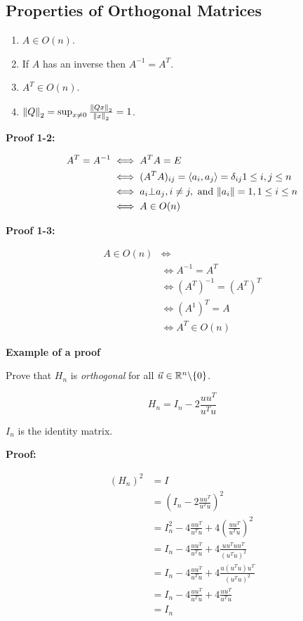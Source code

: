 \subsection{Properties of Orthogonal Matrices}

\begin{enumerate}
   
    \item \(A \in O(n)\).
   
    \item If \(A\) has an inverse then \(A^{-1} = A^T\).
   
    \item \(A^T \in O(n)\).

    \item \(\left\| Q \right\|_2 = \sup_{x \ne 0} \frac{\left\| Qx \right\|_2}{\left\| x \right\|_2} = 1\).

\end{enumerate}

\textbf{Proof 1-2:}

\begin{align*}
    A^T = A^{-1} &\iff A^T A = E\\
                 &\iff (A^T A)_{ij} = \left\langle a_i, a_j\right\rangle = \delta_{ij} 1 \le i,j \le n\\
                 &\iff a_i \bot a_j, i \ne j, \text{ and } \|a_i\| = 1, 1 \le i \le n\\
                 &\iff A \in O(n)
\end{align*}

\textbf{Proof 1-3:}

\begin{align*}
    A \in O(n) &\iff \\
               &\iff A^{-1} = A^T\\
               &\iff (A^T)^{-1} = (A^T)^T \\
               &\iff (A^{1})^{T} = A\\
               &\iff A^T \in O(n)
\end{align*}

\textbf{Example of a proof}

Prove that \(H_n\) is \emph{orthogonal} for all \(\vec{u}\in \mathbb{R}^n \backslash \{0\} \).

\[
    H_n = I_n - 2 \frac{uu^T}{u^Tu}
\]

\(I_n\) is the identity matrix.

\textbf{Proof:}

\begin{align*}
    (H_n)^2 &= I \\
    &= \left(I_n - 2 \frac{uu^T}{u^Tu}\right)^2\\
    &= I_n^2 - 4\frac{uu^T}{u^Tu} + 4\left(\frac{uu^T}{u^Tu}\right)^2\\
    &= I_n -4\frac{uu^T}{u^Tu} +4\frac{uu^T uu^T}{(u^Tu)^2}\\ 
    &= I_n -4\frac{uu^T}{u^Tu} +4\frac{u(u^T u)u^T}{(u^Tu)^2}\\ 
    &= I_n -4\frac{uu^T}{u^Tu} +4\frac{uu^T}{u^Tu}\\ 
    &= I_n
\end{align*}

